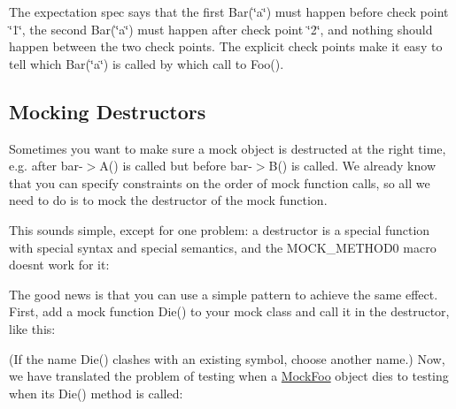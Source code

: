 The expectation spec says that the first {\ttfamily Bar(\char`\"{}a\char`\"{})} must happen before check point \char`\"{}1\char`\"{}, the second {\ttfamily Bar(\char`\"{}a\char`\"{})} must happen after check point \char`\"{}2\char`\"{}, and nothing should happen between the two check points. The explicit check points make it easy to tell which {\ttfamily Bar(\char`\"{}a\char`\"{})} is called by which call to {\ttfamily Foo()}.

\subsection*{Mocking Destructors}

Sometimes you want to make sure a mock object is destructed at the right time, e.\+g. after {\ttfamily bar-\/$>$A()} is called but before {\ttfamily bar-\/$>$B()} is called. We already know that you can specify constraints on the order of mock function calls, so all we need to do is to mock the destructor of the mock function.

This sounds simple, except for one problem\+: a destructor is a special function with special syntax and special semantics, and the {\ttfamily M\+O\+C\+K\+\_\+\+M\+E\+T\+H\+O\+D0} macro doesn\textquotesingle{}t work for it\+:


\begin{DoxyCode}{0}
\end{DoxyCode}


The good news is that you can use a simple pattern to achieve the same effect. First, add a mock function {\ttfamily Die()} to your mock class and call it in the destructor, like this\+:


\begin{DoxyCode}{0}
\DoxyCodeLine{\};}
\end{DoxyCode}


(If the name {\ttfamily Die()} clashes with an existing symbol, choose another name.) Now, we have translated the problem of testing when a {\ttfamily \mbox{\hyperlink{class_mock_foo}{Mock\+Foo}}} object dies to testing when its {\ttfamily Die()} method is called\+:


\begin{DoxyCode}{0}
\DoxyCodeLine{\{}
\DoxyCodeLine{}
\DoxyCodeLine{\}}
\end{DoxyCode}



